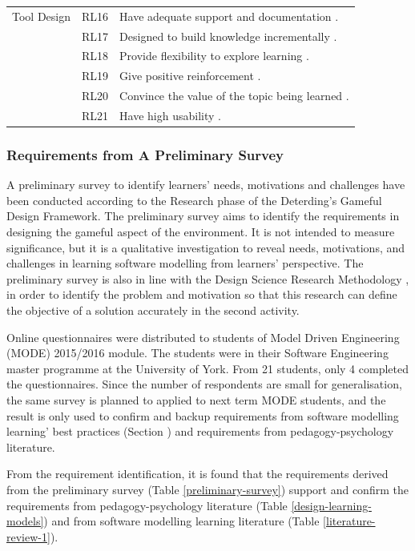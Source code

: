 \documentclass[10pt, a4paper]{report} \usepackage[titletoc]{appendix}
\begin{document}
\begin{table}[t!]
\begin{center}
\begin{tabular}{ p{1.6cm}p{1cm}p{10.4cm} }
\hline
\multirow{1}{2cm}{Tool Design}
& RL16 & Have adequate support and documentation \cite{liebel2015ready}. \\
& RL17 & Designed to build knowledge incrementally \cite{lethbridge2014teaching}.\\
& RL18 & Provide flexibility to explore learning \cite{lethbridge2014teaching}. \\
& RL19 & Give positive reinforcement \cite{lethbridge2014teaching}. \\
& RL20 & Convince the value of the topic being learned \cite{lethbridge2014teaching}. \\ 
& RL21 & Have high usability \cite{lethbridge2014teaching}.\\ 
\hline
\end{tabular}
\end{center}
\end{table}

\subsubsection{Requirements from A Preliminary Survey}
\label{Requirements from A Preliminary Survey}
A preliminary survey to identify learners' needs, motivations and challenges have been conducted according to the Research phase of the Deterding's Gameful Design Framework\cite{deterding2015lens}. The preliminary survey aims to identify the requirements in designing the gameful aspect of the environment. It is not intended to measure significance, but it is a qualitative investigation to reveal needs, motivations, and challenges in learning software modelling from learners' perspective. The preliminary survey is also in line with the Design Science Research Methodology \cite{peffers2007design}, in order to identify the problem and motivation so that this research can define the objective of a solution accurately in the second activity.

Online questionnaires were distributed to students of Model Driven Engineering (MODE) 2015/2016 module. The students were in their Software Engineering master programme at the University of York. From 21 students, only 4 completed the questionnaires. Since the number of respondents are small for generalisation, the same survey is planned to applied to next term MODE students, and the result is only used to confirm and backup requirements from software modelling learning' best practices (Section ) and requirements from pedagogy-psychology literature.

From the requirement identification, it is found that the requirements derived from the preliminary survey (Table \ref{preliminary-survey}) support and confirm the requirements from pedagogy-psychology literature (Table \ref{design-learning-models}) and from software modelling learning literature (Table \ref{literature-review-1}). 
\end{document}
